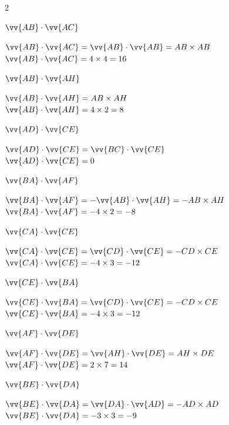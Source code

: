 \documentclass[12pt,a4paper]{article}  %
\begin{document}
\begin{multicols}{2}
	\begin{enumMet}
		\item $ \vv{A B} \cdot  \vv{A C}$
		\begin{corrBox}
			$ \vv{A B} \cdot  \vv{A C}= \vv{A B} \cdot  \vv{A B}=AB\times AB$\\ 
			$ \vv{A B} \cdot  \vv{A C}= 4\times4=16$
		\end{corrBox}
		\item $ \vv{A B} \cdot  \vv{A H}$
		\begin{corrBox}
			$ \vv{A B} \cdot  \vv{A H}= AB\times AH$\\ 
			$ \vv{A B} \cdot  \vv{A H}= 4\times2=8$
		\end{corrBox}
		\item $ \vv{A D} \cdot  \vv{C E}$
		\begin{corrBox}
			$ \vv{A D} \cdot  \vv{CE}= \vv{BC} \cdot  \vv{CE}$\\ 
			$ \vv{A D} \cdot  \vv{CE}= 0$
		\end{corrBox}
		\item $ \vv{B A} \cdot  \vv{A F}$
		\begin{corrBox}
			$ \vv{BA} \cdot  \vv{AF}= -\vv{A B} \cdot  \vv{A H}=-AB\times AH$\\ 
			$ \vv{BA} \cdot  \vv{AF}= -4\times2=-8$
		\end{corrBox}
		
		\columnbreak
		\item $ \vv{C A} \cdot  \vv{C E}$
		\begin{corrBox}
			$ \vv{CA} \cdot  \vv{CE}= \vv{CD} \cdot  \vv{CE}=-CD\times CE$\\ 
			$ \vv{CA} \cdot  \vv{CE}=- 4\times3=-12$
		\end{corrBox}
		\item $ \vv{C E} \cdot  \vv{B A}$
		\begin{corrBox}
			$ \vv{CE} \cdot  \vv{BA}= \vv{CD} \cdot  \vv{CE}=-CD\times CE$\\ 
			$ \vv{CE} \cdot  \vv{BA}= -4\times3=-12$
		\end{corrBox}
		\item $ \vv{A F} \cdot  \vv{D E}$
		\begin{corrBox}
			$ \vv{A F} \cdot  \vv{DE}= \vv{AH} \cdot  \vv{DE}=AH\times DE$\\ 
			$ \vv{AF} \cdot  \vv{DE}= 2\times7=14$
		\end{corrBox}
		\item $ \vv{B E} \cdot  \vv{D A}$
		\begin{corrBox}
			$ \vv{BE} \cdot  \vv{DA}= \vv{DA} \cdot  \vv{AD}=-AD\times AD$\\ 
			$ \vv{BE} \cdot  \vv{DA}= -3\times3=-9$
		\end{corrBox}
	\end{enumMet}
\end{multicols}
\end{document}
